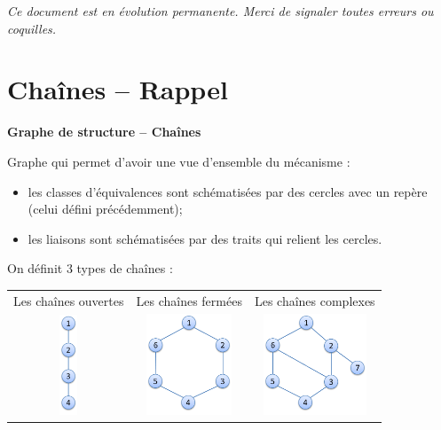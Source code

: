 \documentclass[10pt,oneside]{article}
\begin{document}
\textit{Ce document est en évolution permanente. Merci de signaler toutes erreurs ou coquilles.}
\tableofcontents

 \renewcommand{\baselinestretch}{1.2}
\setlength{\parskip}{2ex plus 0.5ex minus 0.2ex}



\section{Chaînes -- Rappel}
\begin{defi}
\textbf{Graphe de structure -- Chaînes}

Graphe qui permet d'avoir une vue d'ensemble du mécanisme :
\begin{itemize}
\item les classes d'équivalences sont schématisées par des cercles avec un repère (celui défini précédemment);
\item les liaisons sont schématisées par des traits qui relient les cercles.
\end{itemize}

On définit 3 types de chaînes :
\begin{center}
\begin{tabular}{ccc}
Les chaînes ouvertes & Les chaînes fermées & Les chaînes complexes \\
\includegraphics[height=3cm]{png/co.png}
&
\includegraphics[height=3cm]{png/cf.png}
&
\includegraphics[height=3cm]{png/cc.png}\\
\end{tabular}
\end{center}
\end{defi}
\end{document}
